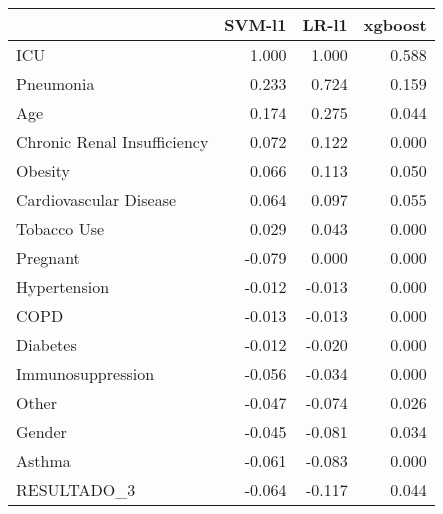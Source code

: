 \begin{tabular}{lrrr}
\toprule
{} &  SVM-l1 &  LR-l1 &  xgboost \\
\midrule
ICU                         &   1.000 &  1.000 &    0.588 \\
Pneumonia                   &   0.233 &  0.724 &    0.159 \\
Age                         &   0.174 &  0.275 &    0.044 \\
Chronic Renal Insufficiency &   0.072 &  0.122 &    0.000 \\
Obesity                     &   0.066 &  0.113 &    0.050 \\
Cardiovascular Disease      &   0.064 &  0.097 &    0.055 \\
Tobacco Use                 &   0.029 &  0.043 &    0.000 \\
Pregnant                    &  -0.079 &  0.000 &    0.000 \\
Hypertension                &  -0.012 & -0.013 &    0.000 \\
COPD                        &  -0.013 & -0.013 &    0.000 \\
Diabetes                    &  -0.012 & -0.020 &    0.000 \\
Immunosuppression           &  -0.056 & -0.034 &    0.000 \\
Other                       &  -0.047 & -0.074 &    0.026 \\
Gender                      &  -0.045 & -0.081 &    0.034 \\
Asthma                      &  -0.061 & -0.083 &    0.000 \\
RESULTADO\_3                 &  -0.064 & -0.117 &    0.044 \\
\bottomrule
\end{tabular}
